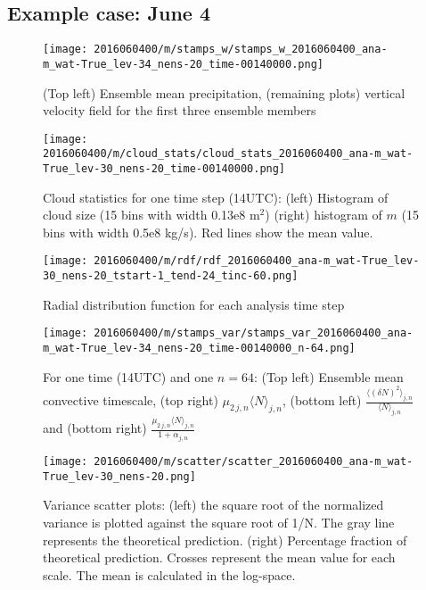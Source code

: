 \documentclass[a4paper, 12pt]{article}
\begin{document}
\subsection{Example case: June 4}
\begin{figure}[ht] \label{fig:ex_stamps_w}
\noindent \centering
\texttt{[image: 2016060400/m/stamps\_w/stamps\_w\_2016060400\_ana-m\_wat-True\_lev-34\_nens-20\_time-00140000.png]}\\
\caption{(Top left) Ensemble mean precipitation, (remaining plots) vertical velocity field for the first three ensemble members}
\end{figure}

\begin{figure}[ht] \label{fig:ex_cloud_stats}
\noindent \centering
\texttt{[image: 2016060400/m/cloud\_stats/cloud\_stats\_2016060400\_ana-m\_wat-True\_lev-30\_nens-20\_time-00140000.png]}\\
\caption{Cloud statistics for one time step (14UTC): (left) Histogram of cloud size (15 bins with width 0.13e8 m$^2$) (right) histogram of $m$ (15 bins with width 0.5e8 kg/s). Red lines show the mean value.}
\end{figure}

\begin{figure}[ht] \label{fig:ex_rdf}
\noindent \centering
\texttt{[image: 2016060400/m/rdf/rdf\_2016060400\_ana-m\_wat-True\_lev-30\_nens-20\_tstart-1\_tend-24\_tinc-60.png]}\\
\caption{Radial distribution function for each analysis time step}
\end{figure}

\begin{figure}[ht] \label{fig:ex_stamps_var}
\noindent \centering
\texttt{[image: 2016060400/m/stamps\_var/stamps\_var\_2016060400\_ana-m\_wat-True\_lev-34\_nens-20\_time-00140000\_n-64.png]}\\
\caption{For one time (14UTC) and one $n=64$: (Top left) Ensemble mean convective timescale, (top right) $\mu_{2\,j,n}\langle N \rangle_{j,n}$, (bottom left) $\frac{\langle (\delta N)^2 \rangle_{j,n}}{\langle N \rangle_{j,n}}$ and (bottom right) $\frac{\mu_{2\,j,n}\langle N\rangle_{j,n}}{1 + \alpha_{j,n}}$}
\end{figure}

\begin{figure}[ht] \label{fig:ex_scatter}
\noindent \centering
\texttt{[image: 2016060400/m/scatter/scatter\_2016060400\_ana-m\_wat-True\_lev-30\_nens-20.png]}\\
\caption{Variance scatter plots: (left) the square root of the normalized variance is plotted against the square root of 1/N. The gray line represents the theoretical prediction. (right) Percentage fraction of theoretical prediction. Crosses represent the mean value for each scale. The mean is calculated in the log-space.}
\end{figure}
\end{document}
